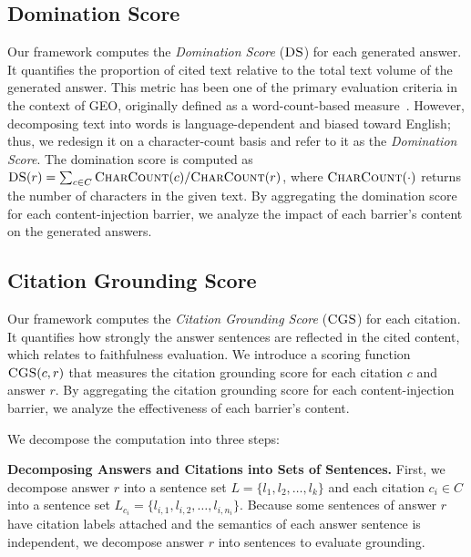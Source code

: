 \subsection{Domination Score}
Our framework computes the \emph{Domination Score} ($\textsc{DS}$) for each generated answer.
It quantifies the proportion of cited text relative to the total text volume of the generated answer.
This metric has been one of the primary evaluation criteria in the context of GEO, originally defined as a word-count-based measure~\cite{geo-apmr+24}.
However, decomposing text into words is language-dependent and biased toward English; thus, we redesign it on a character-count basis and refer to it as the \emph{Domination Score}.
The domination score is computed as $\textsc{DS}(r) = \sum_{c \in C} \textsc{CharCount}(c) / \textsc{CharCount}(r)$, where $\textsc{CharCount}(\cdot)$ returns the number of characters in the given text.
By aggregating the domination score for each content-injection barrier, we analyze the impact of each barrier's content on the generated answers.

\subsection{Citation Grounding Score}
\label{subsec:citation_grounding}
Our framework computes the \emph{Citation Grounding Score} ($\textsc{CGS}$) for each citation.
It quantifies how strongly the answer sentences are reflected in the cited content, which relates to faithfulness evaluation.
We introduce a scoring function $\textsc{CGS}(c, r)$ that measures the citation grounding score for each citation $c$ and answer $r$.
By aggregating the citation grounding score for each content-injection barrier, we analyze the effectiveness of each barrier's content.

We decompose the computation into three steps:

\textbf{Decomposing Answers and Citations into Sets of Sentences.}
First, we decompose answer $r$ into a sentence set $L = \{l_1, l_2, \ldots, l_k\}$ and each citation $c_i \in C$ into a sentence set $L_{c_i} = \{l_{i,1}, l_{i,2}, \ldots, l_{i,n_i}\}$.
Because some sentences of answer $r$ have citation labels attached and the semantics of each answer sentence is independent, we decompose answer $r$ into sentences to evaluate grounding.

